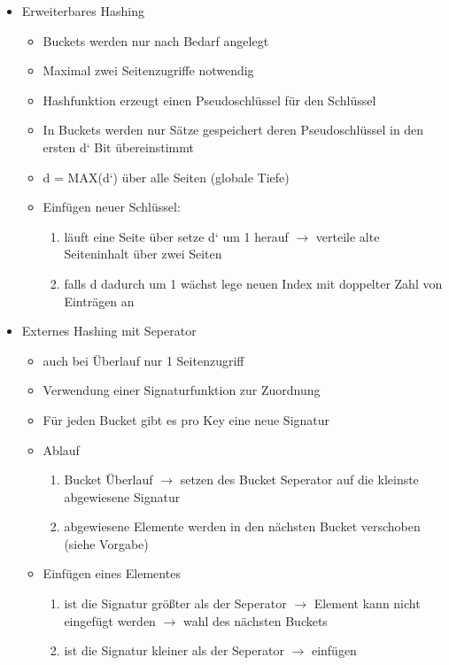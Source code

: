 \documentclass[a4paper]{article}
\begin{document}
\begin{enumerate}
\begin{itemize}
            \item Erweiterbares Hashing
            \begin{itemize}
                \item Buckets werden nur nach Bedarf angelegt
                \item Maximal zwei Seitenzugriffe notwendig
                \item Hashfunktion erzeugt einen Pseudoschlüssel für den Schlüssel
                \item In Buckets werden nur Sätze gespeichert deren Pseudoschlüssel in den ersten d‘ Bit übereinstimmt
                \item d = MAX(d‘) über alle Seiten (globale Tiefe)
                \item Einfügen neuer Schlüssel:
                \begin{enumerate}
                    \item läuft eine Seite über setze d‘ um 1 herauf $\to$ verteile alte Seiteninhalt über zwei Seiten
                    \item falls d dadurch um 1 wächst lege neuen Index mit doppelter Zahl von Einträgen an
                \end{enumerate}
            \end{itemize}
            
            
            
            \item Externes Hashing mit Seperator
            \begin{itemize}
                \item auch bei Überlauf nur 1 Seitenzugriff
                \item Verwendung einer Signaturfunktion zur Zuordnung
                \item Für jeden Bucket gibt es pro Key eine neue Signatur
                \item Ablauf
                \begin{enumerate}
                    \item Bucket Überlauf $\to$ setzen des Bucket Seperator auf die kleinste abgewiesene Signatur 
                    \item abgewiesene Elemente werden in den nächsten Bucket verschoben (siehe Vorgabe)
                \end{enumerate}
                
                \item Einfügen eines Elementes
                \begin{enumerate}
                    \item ist die Signatur größter als der Seperator $\to$ Element kann nicht eingefügt werden $\to$ wahl des nächsten Buckets
                    \item ist die Signatur kleiner als der Seperator $\to$ einfügen
                \end{enumerate}
            \end{itemize}
        \end{itemize}
    \end{enumerate}
    
\end{document}
